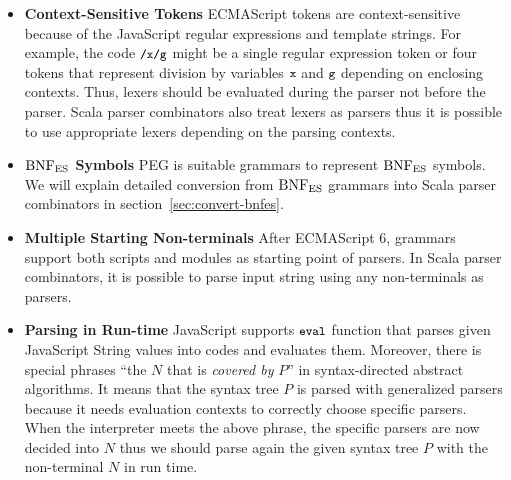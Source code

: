 \begin{itemize}
  \item \textbf{Context-Sensitive Tokens} ECMAScript tokens are context-sensitive
    because of the JavaScript regular expressions and template strings.
    For example, the code \( \texttt{\small/x/g} \) might be a single regular expression token
    or four tokens that represent division by variables \( \texttt{\small x} \) and \( \texttt{\small g} \)
    depending on enclosing contexts. Thus, lexers should be evaluated during the parser
    not before the parser. Scala parser combinators also treat lexers as parsers thus
    it is possible to use appropriate lexers depending on the parsing contexts.
  \item \textbf{\( \text{BNF}_{\text{ES}} \) Symbols} PEG is suitable grammars to represent
    \( \text{BNF}_{\text{ES}} \) symbols. We will explain detailed conversion from
    \( \text{BNF}_{\text{ES}} \) grammars into Scala parser combinators in section~\ref{sec:convert-bnfes}.
  \item \textbf{Multiple Starting Non-terminals} After ECMAScript 6, grammars support
    both scripts and modules as starting point of parsers. In Scala parser combinators,
    it is possible to parse input string using any non-terminals as parsers.
  \item \textbf{Parsing in Run-time} JavaScript supports \( \texttt{\small eval} \)
    function that parses given JavaScript String values into codes and evaluates them.
    Moreover, there is special phrases ``the \( N \) that is \textit{covered by}
    \( P \)'' in syntax-directed abstract algorithms.
    It means that the syntax tree \( P \) is parsed with generalized parsers because
    it needs evaluation contexts to correctly choose specific parsers.
    When the interpreter meets the above phrase, the specific parsers are now
    decided into \( N \) thus we should parse again the given syntax tree \( P \) with
    the non-terminal \( N \) in run time.
\end{itemize}

